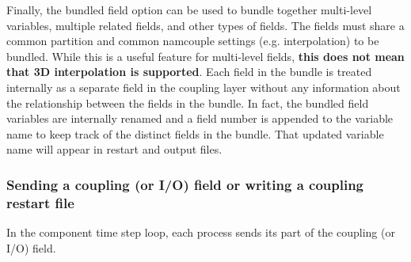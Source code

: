 Finally, the bundled field option can be used to
bundle together multi-level variables, multiple related fields, and other types
of fields.  The fields must share a common partition and common namcouple settings (e.g. interpolation)
to be bundled.  While this is a useful feature for multi-level fields, {\bf this does not mean
that 3D interpolation is supported}.
Each field in the bundle is
treated internally as a separate field in the coupling layer without
any information about the relationship between the fields in the bundle.  In fact,
the bundled field variables are internally renamed and a field number is appended
to the variable name to keep track of the distinct fields in the bundle.  That
updated variable name will appear in restart and output files.


\subsubsection{Sending a coupling (or I/O) field or writing a coupling restart file}
\label{prismput}

In the component time step loop, each process sends its part of the
coupling (or I/O) field.


